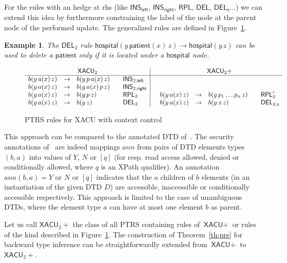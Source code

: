 \documentclass[a4paper]{article}
\theoremstyle{plain}
\newtheorem{example}{Example}{\itshape}{\rmfamily}
\newcommand{\XACU}{\textsf{XACU}}
\newcommand{\INS}{\mathsf{INS}}
\newcommand{\RPL}{\mathsf{RPL}}
\newcommand{\DEL}{\mathsf{DEL}}
\newcommand{\ann}{\mathit{ann}}
\begin{document}
For the rules with an hedge at rhs
(like $\INS_\mathsf{left}$, $\INS_\mathsf{right}$, $\RPL$, $\DEL$, $\DEL_{\mathsf{s}}$...)
we can extend this idea by furthermore constraining the label of the node 
at the parent node of the performed update.
The generalized rules are defined in Figure~\ref{fig:XACU2}.
\begin{example}
The $\DEL_2$ rule $\mathsf{hospital}(y\,\mathsf{patient}(x)\,z) \to \mathsf{hospital}(y\,z)$ can be used
to delete a $\mathsf{patient}$ only if it is located under a $\mathsf{hospital}$ node.
\end{example}


\begin{figure}
\[
\begin{array}{rclcl|crclcl}
\multicolumn{5}{c|}{\XACU_2} & & \multicolumn{5}{c}{\XACU_2+}\\
\hline
b(y\, a(x)\, z) & \to & b(y\, p\, a(x)\, z)    & & \INS_{2,\mathsf{left}}\\
b(y\, a(x)\, z) & \to & b(y\, a(x)\, p\, z)    & & \INS_{2,\mathsf{right}}\\
b(y\, a(x)\, z) & \to & b(y\, p\, z)  & & \RPL_2 & &
b(y\, a(x)\, z) & \to & b(y\, p_1 \ldots p_n\, z) & & \RPL_2'\\
b(y\, a(x)\, z) & \to & b(y\, z)     & & \DEL_2 & &
b(y\, a(x)\, z) & \to & b(y\, x\, z)         & & \DEL_{2,\mathsf{s}}\\
\end{array}
\]
\caption{PTRS rules for XACU with context control}
\label{fig:XACU2}
\end{figure}

This approach can be compared to the annotated DTD of~\cite{FanChan04}.
The security annotations of~\cite{FanChan04} are indeed mappings $\ann$ from 
pairs of DTD elements types $(b,a)$ into values of $Y$, $N$ or $[q]$
(for resp. read access allowed, denied or conditionally allowed, where $q$ is an XPath qualifier).
An annotation $\ann(b,a) = Y$ or $N$ or $[q]$ indicates
that the $a$ children of $b$ elements (in an instantiation of the given DTD $D$) 
are accessible, inaccessible or conditionally accessible respectively.
This approach is limited to the case of unambiguous DTDs,
where the element type $a$ can have at most one element $b$ as parent.


Let us call $\XACU_2+$ the class of all PTRS containing rules of $\XACU+$ or
rules of the kind described in Figure~\ref{fig:XACU2}.
The construction of Theorem~\ref{th:pre} 
for backward type inference 
can be straightforwardly extended from $\XACU+$ to $\XACU_2+$.
\end{document}
